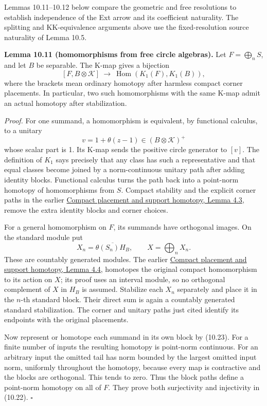 \documentclass[
  11pt,
]{article}
\begin{document}
Lemmas 10.11--10.12 below compare the geometric and free resolutions to
establish independence of the Ext arrow and its coefficient naturality.
The splitting and KK-equivalence arguments above use the
fixed-resolution source naturality of Lemma 10.5.

\textbf{Lemma 10.11 (homomorphisms from free circle algebras).} Let
\(F=\bigoplus_n S\), and let \(B\) be separable. The K-map gives a
bijection \[
[F,B\otimes\mathcal K]\ \longrightarrow\
\operatorname{Hom}(K_1(F),K_1(B)),
\tag{10.22}
\] where the brackets mean ordinary homotopy after harmless compact
corner placements. In particular, two such homomorphisms with the same
K-map admit an actual homotopy after stabilization.

\emph{Proof.} For one summand, a homomorphism is equivalent, by
functional calculus, to a unitary \[
v=1+\theta(z-1)\in(B\otimes\mathcal K)^+
\tag{10.23}
\] whose scalar part is 1. Its K-map sends the positive circle generator
to \([v]\). The definition of \(K_1\) says precisely that any class has
such a representative and that equal classes become joined by a
norm-continuous unitary path after adding identity blocks. Functional
calculus turns the path back into a point-norm homotopy of homomorphisms
from \(S\). Compact stability and the explicit corner paths in the
earlier
\href{supporting/compact-placement/compact-support.html\#compact-placement}{Compact
placement and support homotopy, Lemma 4.3}, remove the extra identity
blocks and corner choices.

For a general homomorphism on \(F\), its summands have orthogonal
images. On the standard module put \[
X_n=\overline{\theta(S_n)H_B},\qquad X=\bigoplus_n X_n.
\tag{10.24}
\] These are countably generated modules. The earlier
\href{supporting/compact-placement/compact-support.html\#compact-support}{Compact
placement and support homotopy, Lemma 4.4}, homotopes the original
compact homomorphism to its action on \(X\); its proof uses an interval
module, so no orthogonal complement of \(X\) in \(H_B\) is assumed.
Stabilize each \(X_n\) separately and place it in the \(n\)-th standard
block. Their direct sum is again a countably generated standard
stabilization. The corner and unitary paths just cited identify its
endpoints with the original placements.

Now represent or homotope each summand in its own block by (10.23). For
a finite number of inputs the resulting homotopy is point-norm
continuous. For an arbitrary input the omitted tail has norm bounded by
the largest omitted input norm, uniformly throughout the homotopy,
because every map is contractive and the blocks are orthogonal. This
tends to zero. Thus the block paths define a point-norm homotopy on all
of \(F\). They prove both surjectivity and injectivity in (10.22).
\(\square\)
\end{document}
